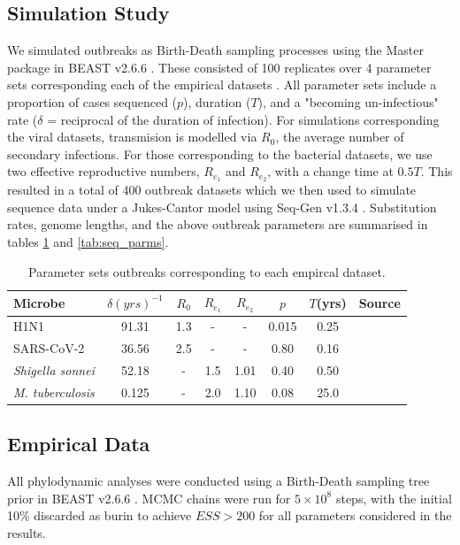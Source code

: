 \documentclass{article}
\begin{document}
\begin{spacing}{1.5}
\subsection*{Simulation Study}
We simulated outbreaks as Birth-Death sampling processes using the Master package in BEAST v2.6.6 \citep{vaughan_stochastic_2013,bouckaert_beast_2019}. These consisted of 100 replicates over 4 parameter sets corresponding each of the empirical datasets . All parameter sets include a proportion of cases sequenced ($p$), duration ($T$), and a "becoming un-infectious" rate ($\delta$ = reciprocal of the duration of infection). For simulations corresponding the viral datasets, transmision is modelled via $R_0$, the average number of secondary infections. For those corresponding to the bacterial datasets, we use two effective reproductive numbers, $R_{e_1}$ and $R_{e_2}$, with a change time at $0.5T$. This resulted in a total of 400 outbreak datasets which we then used to simulate sequence data under a Jukes-Cantor model using Seq-Gen v1.3.4 \citep{rambaut_seq-gen_1997}. Substitution rates, genome lengths, and the above outbreak parameters are summarised in tables \ref{tab:sim_parms} and \ref{tab:seq_parms}.

\begin{table}[ht]
    \centering
    \caption{Parameter sets outbreaks corresponding to each empircal dataset.}
    \begin{tabular}{l|c|c|c|c|c|c|l|}
    \hline
    Microbe                     &   $\delta (yrs)^{-1}$    & $R_0$ &   $R_{e_1}$   &  $R_{e_2}$    &   $p$   &   $T$(yrs)   & Source \\
    \hline
    H1N1                        &   91.31    & 1.3 &   -   &  -    &   0.015   &   0.25 & \citet{hedge_2013_real-time} \\
    SARS-CoV-2                  &   36.56    & 2.5 &   -   &  -   &   0.80   &  0.16 & \citet{lane2021genomics} \\
    \textit{Shigella sonnei}    &   52.18    &  - &   1.5   &  1.01   &   0.40   &   0.50 & \citet{ingle_co-circulation_2019} \\
    \textit{M. tuberculosis}    &   0.125    &  - &   2.0   &  1.10    &   0.08   &   25.0 & \citet{kuhnert_tuberculosis_2018} \\
    \hline
    \end{tabular}
    \label{tab:sim_parms}
\end{table}

\subsection*{Empirical Data}
All phylodynamic analyses were conducted using a Birth-Death sampling tree prior in BEAST v2.6.6 \citep{bouckaert_beast_2019}. MCMC chains were run for $5\times10^{8}$ steps, with the initial 10\% discarded as burin to achieve $ESS > 200$ for all parameters considered in the results.


\end{spacing}
\end{document}
